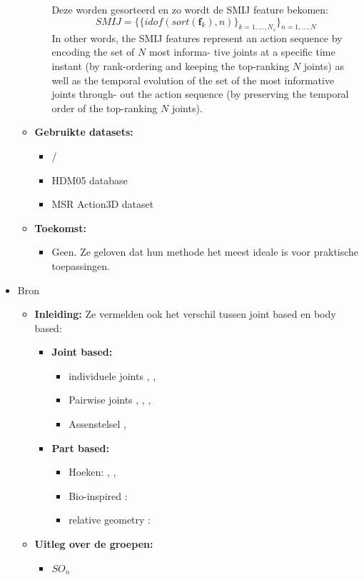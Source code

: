 \begin{itemize}
\begin{itemize}
\begin{enumerate}
			Deze worden gesorteerd en zo wordt de SMIJ feature bekomen:
			$$ SMIJ = \{\{ idof(sort(\textbf{f}_k) ,n)\}_{k=1,...,N_s}\}_{n=1,...,N}$$
			In other words, the SMIJ features represent an action sequence by encoding the set of $N$ most informa- tive joints at a specific time instant (by rank-ordering and keeping the top-ranking $N$ joints) as well as the temporal evolution of the set of the most informative joints through- out the action sequence (by preserving the temporal order of
			the top-ranking $N$ joints).
		\end{enumerate}
		\item \textbf{Gebruikte datasets:}
		\begin{itemize}
			\item /
			\item HDM05 database
			\item MSR Action3D dataset
		\end{itemize}
		\item \textbf{Toekomst:}
		\begin{itemize}
			\item {\color{red}Geen. Ze geloven dat hun methode het meest ideale is voor praktische toepassingen.}
		\end{itemize}
	\end{itemize}
	\item Bron \cite{Vemulapalli2016}
	\begin{itemize}	
		\item \textbf{Inleiding:} Ze vermelden ook het verschil tussen joint based en body based: 
		\begin{itemize}
			\item \textbf{Joint based:}
			\begin{itemize}
				\item individuele joints \cite{Gowayyed2013}, \cite{Gu2010}, \cite{Hussein2011}
				\item Pairwise joints \cite{Wang2012b}, \cite{Wang2013}, \cite{Wei2013}, \cite{Yang2012}
				\item Assenstelsel \cite{Xia2012}, \cite{Zhanpeng2013}
			\end{itemize}
			\item  \textbf{Part based:}
			\begin{itemize}
				\item Hoeken: \cite{Ofli2012}, \cite{Ohn-Bar2013}, \cite{JaeyongSung2012}
				\item Bio-inspired : \cite{Chaudhry2013}
				\item relative geometry : \cite{Vemulapalli2014}
			\end{itemize}
		\end{itemize}
		\item \textbf{Uitleg over de groepen:}
		\begin{itemize}
			\item \textbf{$SO_n$}
			

\end{itemize}
\end{itemize}
\end{itemize}
